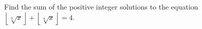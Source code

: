 Find the sum of the positive integer solutions to the equation $\left\lfloor\sqrt[3]{x}\right\rfloor+\left\lfloor\sqrt[4]{x}\right\rfloor=4.$